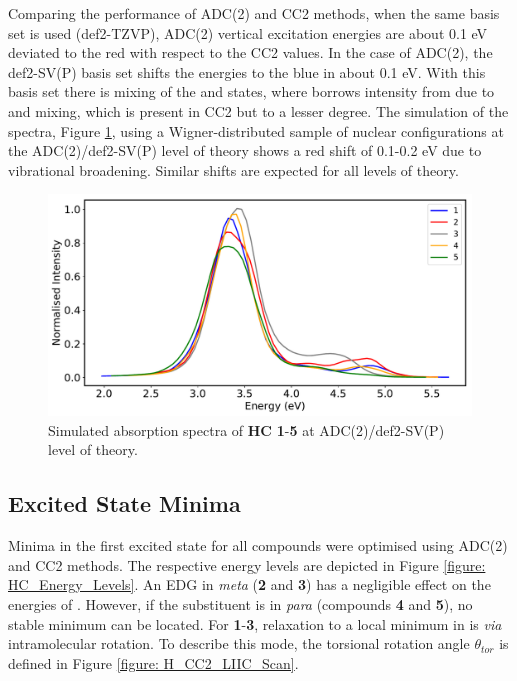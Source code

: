 Comparing the performance of ADC(2) and CC2 methods, when the same basis set is used (def2-TZVP), ADC(2) vertical excitation energies are about 0.1 eV deviated to the red with respect to the CC2 values. In the case of ADC(2), the def2-SV(P) basis set shifts the energies to the blue in about 0.1 eV. With this basis set there is mixing of the \sone{} and \stwo{} states, where \stwo{} borrows intensity from \sone{} due to  \pipistar{} and \npistar{} mixing, which is present in CC2 but to a lesser degree. The simulation of the spectra, Figure \ref{figure: HC_spectra_ADC}, using a Wigner-distributed sample of nuclear configurations at the ADC(2)/def2-SV(P) level of theory shows a red shift of 0.1-0.2 eV due to vibrational broadening. Similar shifts are expected for all levels of theory.
\begin{figure}[t]
\centering
  \includegraphics[width=0.8\linewidth]{3nonradiativedecay/HC_Spectra_ADC2.pdf}
  \caption[Simulated absorption spectra of \textbf{HC1}-\textbf{5}]{Simulated absorption spectra of \textbf{HC} \textbf{1}-\textbf{5} at ADC(2)/def2-SV(P) level of theory.}
  \label{figure: HC_spectra_ADC}
\end{figure}


\subsection{Excited State Minima}\label{section: NRdecay_Minima}
Minima in the first excited state for all compounds were optimised using ADC(2) and CC2 methods. The respective energy levels are depicted in Figure \ref{figure: HC_Energy_Levels}. An \ac{EDG} in \textit{meta} (\textbf{2} and \textbf{3}) has a negligible effect on the energies of \Estar. However, if the substituent is in \textit{para} (compounds \textbf{4} and \textbf{5}), no stable \Estar{} minimum can be located. For \textbf{1}-\textbf{3}, relaxation to a local minimum in \Estar{} is \textit{via} intramolecular rotation. To describe this mode, the torsional rotation angle $\theta_{tor}$ is defined in Figure \ref{figure: H_CC2_LIIC_Scan}.

